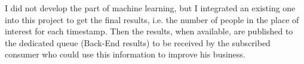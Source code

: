 I did not develop the part of machine learning, but I integrated an existing one into this project to get the final results, i.e. the number of people in the place of interest for each timestamp. Then the results, when available, are published to the dedicated queue (Back-End results) to be received by the subscribed consumer who could use this information to improve his business.
